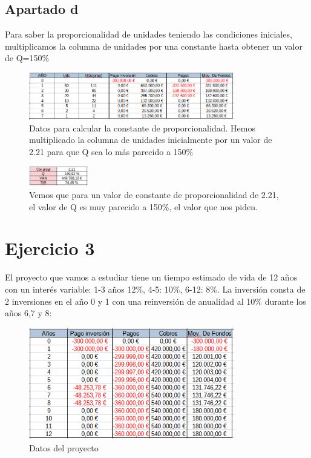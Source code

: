 \documentclass[11pt,letterpaper,onecolumn]{article}
\begin{document}
\subsection{Apartado d}
Para saber la proporcionalidad de unidades teniendo las condiciones iniciales, multiplicamos la columna de unidades por una constante hasta obtener un valor de Q=150\%
\begin{figure}[H]
	\centering
	\includegraphics[width=0.8\textwidth]{imagen/ej2d.PNG}
	\caption{Datos para calcular la constante de proporcionalidad. Hemos multiplicado la columna de unidades inicialmente por un valor de 2.21 para que Q sea lo más parecido a 150\%}
	\label{fig:imagen-ej2d-PNG}
\end{figure}
\begin{figure}[H]
	\centering
	\includegraphics[width=0.23\textwidth]{imagen/ej2d_van.PNG}
	\caption{Vemos que para un valor de constante de proporcionalidad de 2.21, el valor de Q es muy parecido a 150\%, el valor que nos piden.}
	\label{fig:imagen-ej2d_van-PNG}
\end{figure}

\section{Ejercicio 3}%
\label{sec:Ejercicio 3}
El proyecto que vamos a estudiar tiene un tiempo estimado de vida de 12 años con un interés variable: 1-3 años 12\%, 4-5: 10\%, 6-12: 8\%. La inversión consta de 2 inversiones en el año 0 y 1 con una reinversión de anualidad al 10\% durante los años 6,7 y 8:
\begin{figure}[H]
	\centering
	\includegraphics[width=0.8\textwidth]{imagen/ej3a.png}
	\caption{Datos del proyecto}
	\label{fig:imagen-}
\end{figure}
\end{document}
